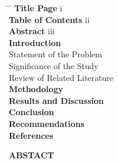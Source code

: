 \documentclass[12pt]{article}
\begin{document}
\begin{flushleft}
\begin{tabbing}
\hspace{5cm} \= \hspace{10cm} \= \kill
\textbf{Title Page} \> \dotfill \> i \\
\textbf{Table of Contents} \> \dotfill \> ii \\
\textbf{Abstract} \> \dotfill \> iii \\[0.5cm]

\textbf{Introduction} \> \dotfill {} \\
\hspace{1cm} Statement of the Problem \> \dotfill {} \\
\hspace{1cm} Significance of the Study \> \dotfill {} \\
\hspace{1cm} Review of Related Literature \> \dotfill {} \\
\textbf{Methodology} \> \dotfill {} \\
\textbf{Results and Discussion} \> \dotfill {} \\
\textbf{Conclusion} \> \dotfill {} \\
\textbf{Recommendations} \> \dotfill {} \\
\textbf{References} \> \dotfill {} \\

\setcounter{page}{2}
\end{tabbing}
\end{flushleft}

\newpage
\begin{center}
\textbf{ABSTACT}
\end{center}
\end{document}
